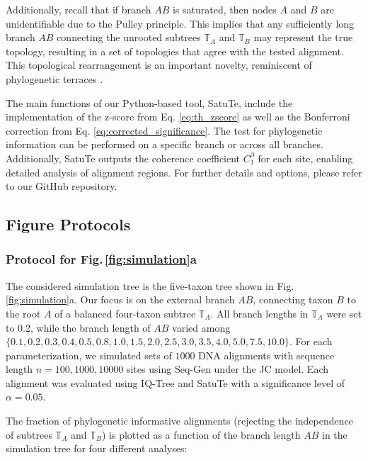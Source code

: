 \medskip

Additionally, recall that if branch $AB$ is saturated, then nodes $A$ and $B$ are unidentifiable due to the Pulley principle. This implies that any sufficiently long branch $AB$ connecting the unrooted subtrees $\mathbb{T}_A$ and $\mathbb{T}_B$ may represent the true topology, resulting in a set of topologies that agree with the tested alignment. This topological rearrangement is an important novelty, reminiscent of phylogenetic terraces .

\medskip

The main functions of our Python-based tool, SatuTe, include the implementation of the z-score from Eq. \eqref{eq:th_zscore}
as well as the Bonferroni correction from Eq. \eqref{eq:corrected_significance}. The test for phylogenetic information can be performed on a specific branch or across all branches. Additionally, SatuTe outputs the coherence coefficient $C^\partial_1$ for each site, enabling detailed analysis of alignment regions. For further details and options, please refer to our GitHub repository.

\newpage


\subsection{Figure Protocols}\label{msec:figprotocols}

\subsubsection*{Protocol for Fig.\,\ref{fig:simulation}a} \label{sec:protocol_simulation_5taxa}
The considered simulation tree is the five-taxon tree shown in Fig.\,\ref{fig:simulation}a. Our focus is on the external branch $AB$, connecting taxon $B$ to the root $A$ of a balanced four-taxon subtree $\mathbb{T}_A$. All branch lengths in $\mathbb{T}_A$ were set to 0.2, while the branch length of $AB$ varied among $\{0.1, 0.2, 0.3, 0.4, 0.5, 0.8, 1.0, 1.5, 2.0, 2.5, 3.0, 3.5, 4.0, 5.0, 7.5, 10.0\}$. For each parameterization, we simulated sets of $1000$ DNA alignments with sequence length ${n = 100, 1000, 10000}$ sites using Seq-Gen  under the JC model. Each alignment was evaluated using IQ-Tree  and SatuTe with a significance level of $\alpha = 0.05$.


\medskip
The fraction of phylogenetic informative alignments (rejecting the independence of subtrees $\mathbb{T}_A$ and $\mathbb{T}_B$) is plotted as a function of the branch length $AB$ in the simulation tree for four different analyses:

